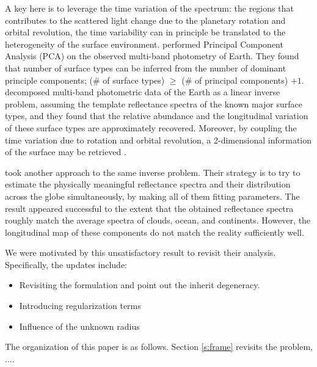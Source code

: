 \documentclass[iop,numberedappendix,apj,]{emulateapj}
\begin{document}
A key here is to leverage the time variation of the spectrum: the regions that contributes to the scattered light change due to the planetary rotation and  orbital revolution, the time variability can in principle be translated to the heterogeneity of the surface environment.  
\citet{Cowan2009, Cowan2011} performed Principal Component Analysis (PCA) on the observed multi-band photometry of Earth. They found that number of surface types can be inferred from the number of dominant principle components; (\# of surface types) $\ge $ (\# of principal components) $+ 1$. %
\citet{Fujii2010, Fujii2011} decomposed multi-band photometric data of the Earth as a linear inverse problem, assuming the template reflectance spectra of the known major surface types, and they found that the relative abundance and the longitudinal variation of these surface types are approximately recovered. 
Moreover, by coupling the time variation due to rotation and orbital revolution, a 2-dimensional information of the surface may be retrieved \citep{Kawahara2010, Kawahara2011, Fujii2012}. 

\citet{Cowan2013} took another approach to the same inverse problem. 
Their strategy is to try to estimate the physically meaningful reflectance spectra and their distribution across the globe simultaneously, by making all of them fitting parameters. 
The result appeared successful to the extent that the obtained reflectance spectra roughly match the average spectra of clouds, ocean, and continents. 
However, the longitudinal map of these components do not match the reality sufficiently well. 

We were motivated by this unsatisfactory result to revisit their analysis. 
Specifically, the updates include:
\begin{itemize}
\item Revisiting the formulation and point out the inherit degeneracy. 
\item Introducing regularization terms
\item Influence of the unknown radius
\end{itemize}

The organization of this paper is as follows. 
Section \ref{s:frame} revisits the problem, ....

\end{document}

